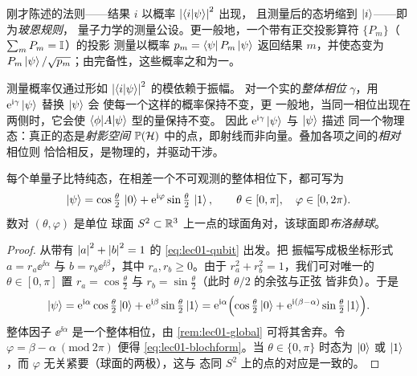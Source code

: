 刚才陈述的法则——结果 $i$ 以概率 $\left\lvert \braket{i|\psi} \right\rvert^{2}$ 出现，
且测量后的态坍缩到 $\ket{i}$——即为\emph{玻恩规则}，
量子力学的测量公设。更一般地，一个带有正交投影算符 $\{P_m\}$（$\sum_m P_m=\mathbb{I}$）的投影
测量以概率 $p_m=\bra{\psi}P_m\ket{\psi}$ 返回结果
$m$，并使态变为 $P_m\ket{\psi}/\sqrt{p_m}$；由完备性，这些概率之和为一。

\begin{remark}[整体相位不可观测]\label{rem:lec01-global}
测量概率仅通过形如 $\left\lvert \braket{i|\psi} \right\rvert^{2}$ 的模依赖于振幅。
对一个实的\emph{整体相位} $\gamma$，用 $\mathrm{e}^{\mathrm{i}\gamma}\ket{\psi}$ 替换 $\ket{\psi}$ 会
使每一个这样的概率保持不变，更
一般地，当同一相位出现在两侧时，它会使 $\braket{\phi|A|\psi}$ 型的量保持不变。
因此 $\mathrm{e}^{\mathrm{i}\gamma}\ket{\psi}$ 与 $\ket{\psi}$ 描述
同一个物理态：真正的态是\emph{射影空间}
$\mathbb{P}(\mathcal{H})$ 中的点，即射线而非向量。叠加各项之间的\emph{相对}相位则
恰恰相反，是物理的，并驱动干涉。
\end{remark}

\begin{proposition}[布洛赫参数化]\label{prop:lec01-bloch}
每个单量子比特纯态，在相差一个不可观测的整体相位下，都可写为
\begin{equation}\label{eq:lec01-blochform}
  \ket{\psi}=\cos\tfrac{\theta}{2}\,\ket{0}+\mathrm{e}^{\mathrm{i}\varphi}\sin\tfrac{\theta}{2}\,\ket{1},
  \qquad \theta\in[0,\pi],\quad \varphi\in[0,2\pi).
\end{equation}
数对 $(\theta,\varphi)$ 是单位
球面 $S^{2}\subset\mathbb{R}^{3}$ 上一点的球面角对，该球面即\emph{布洛赫球}。
\end{proposition}

\begin{proof}
从带有 $\left\lvert a \right\rvert^{2}+\left\lvert b \right\rvert^{2}=1$ 的 \eqref{eq:lec01-qubit} 出发。把
振幅写成极坐标形式 $a=r_a \ee^{\ii\alpha}$ 与 $b=r_b \ee^{\ii\beta}$，其中
$r_a,r_b\ge0$。由于 $r_a^{2}+r_b^{2}=1$，我们可对唯一的 $\theta\in[0,\pi]$ 置 $r_a=\cos\tfrac{\theta}{2}$ 与
$r_b=\sin\tfrac{\theta}{2}$（此时 $\theta/2$ 的余弦与正弦
皆非负）。于是
\[
  \ket{\psi}=\mathrm{e}^{\mathrm{i}\alpha}\cos\tfrac{\theta}{2}\ket{0}+\mathrm{e}^{\mathrm{i}\beta}\sin\tfrac{\theta}{2}\ket{1}
           =\mathrm{e}^{\mathrm{i}\alpha}\Bigl(\cos\tfrac{\theta}{2}\ket{0}+\mathrm{e}^{\mathrm{i}(\beta-\alpha)}\sin\tfrac{\theta}{2}\ket{1}\Bigr).
\]
整体因子 $\ee^{\ii\alpha}$ 是一个整体相位，由
\cref{rem:lec01-global} 可将其舍弃。令 $\varphi=\beta-\alpha\ (\mathrm{mod}\ 2\pi)$
便得 \eqref{eq:lec01-blochform}。当 $\theta\in\{0,\pi\}$ 时态为 $\ket{0}$
或 $\ket{1}$，而 $\varphi$ 无关紧要（球面的两极），这与
态同 $S^{2}$ 上的点的对应是一致的。
\end{proof}

